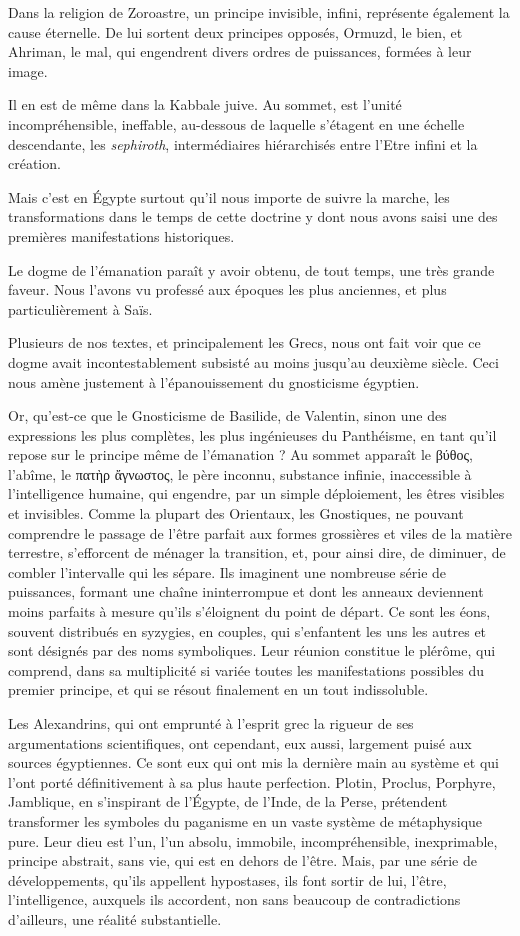 \documentclass[a4paper, 11pt, oneside]{article}
\begin{document}
Dans la religion de Zoroastre, un principe invisible, infini, représente également la cause éternelle. De lui sortent deux principes opposés, Ormuzd, le bien, et Ahriman, le mal, qui engendrent divers ordres de puissances, formées à leur image.

Il en est de même dans la Kabbale juive. Au sommet, est l'unité incompréhensible, ineffable, au-dessous de laquelle s'étagent en une échelle descendante, les \emph{sephiroth}, intermédiaires hiérarchisés entre l'Etre infini et la création.

Mais c'est en Égypte surtout qu'il nous importe de suivre la marche, les transformations dans le temps de cette doctrine y dont nous avons saisi une des premières manifestations historiques.

Le dogme de l'émanation paraît y avoir obtenu, de tout temps, une très grande faveur. Nous l'avons vu professé aux époques les plus anciennes, et plus particulièrement à Saïs.

Plusieurs de nos textes, et principalement les Grecs, nous ont fait voir que ce dogme avait incontestablement subsisté au moins jusqu'au deuxième siècle. Ceci nous amène justement à l'épanouissement du gnosticisme égyptien.

Or, qu'est-ce que le Gnosticisme de Basilide, de Valentin, sinon une des expressions les plus complètes, les plus ingénieuses du Panthéisme, en tant qu'il repose sur le principe même de l'émanation ? Au sommet apparaît le βύθος, l'abîme, le πατὴρ ἄγνωστος, le père inconnu, substance infinie, inaccessible à l'intelligence humaine, qui engendre, par un simple déploiement, les êtres visibles et invisibles. Comme la plupart des Orientaux, les Gnostiques, ne pouvant comprendre le passage de l'être parfait aux formes grossières et viles de la matière terrestre, s'efforcent de ménager la transition, et, pour ainsi dire, de diminuer, de combler l'intervalle qui les sépare. Ils imaginent une nombreuse série de puissances, formant une chaîne ininterrompue et dont les anneaux deviennent moins parfaits à mesure qu'ils s'éloignent du point de départ. Ce sont les éons, souvent distribués en syzygies, en couples, qui s'enfantent les uns les autres et sont désignés par des noms symboliques. Leur réunion constitue le plérôme, qui comprend, dans sa multiplicité si variée toutes les manifestations possibles du premier principe, et qui se résout finalement en un tout indissoluble.

Les Alexandrins, qui ont emprunté à l'esprit grec la rigueur de ses argumentations scientifiques, ont cependant, eux aussi, largement puisé aux sources égyptiennes. Ce sont eux qui ont mis la dernière main au système et qui l'ont porté définitivement à sa plus haute perfection. Plotin, Proclus, Porphyre, Jamblique, en s'inspirant de l'Égypte, de l'Inde, de la Perse, prétendent transformer les symboles du paganisme en un vaste système de métaphysique pure. Leur dieu est l'un, l'un absolu, immobile, incompréhensible, inexprimable, principe abstrait, sans vie, qui est en dehors de l'être. Mais, par une série de développements, qu'ils appellent hypostases, ils font sortir de lui, l'être, l'intelligence, auxquels ils accordent, non sans beaucoup de contradictions d'ailleurs, une réalité substantielle.
\end{document}
